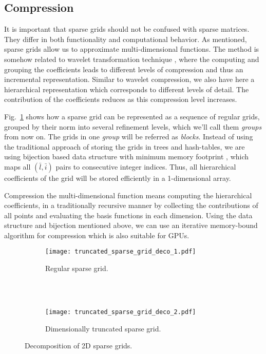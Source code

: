 \subsection{Compression}

It is important that sparse grids should not be confused with sparse matrices.
They differ in both functionality and computational behavior. As mentioned,
sparse grids allow us to approximate multi-dimensional functions. The method is
somehow related to wavelet transformation technique \cite{Mallat89atheory},
where the computing and grouping the coefficients leads to different levels of
compression and thus an incremental representation. Similar to wavelet
compression, we also have here a hierarchical representation which corresponds
to different levels of detail. The contribution of the coefficients reduces as
this compression level increases.

Fig.~\ref{fig:truncated_sparse_grid_deco_1} shows how a sparse grid can be
represented as a sequence of regular grids, grouped by their norm into several
refinement levels, which we'll call them \textit{groups} from now on. The grids
in one \textit{group} will be referred as \textit{blocks}. Instead of using the
traditional approach of storing the grids in trees and hash-tables, we are using
bijection based data structure with minimum memory footprint
\cite{Murarasu:2011:CDS:1941553.1941559}, which maps all $(\bar{l},\bar{i})$
pairs to consecutive integer indices. Thus, all hierarchical coefficients of the
grid will be stored efficiently in a 1-dimensional array.

Compression the multi-dimensional function means computing the hierarchical
coefficients, in a traditionally recursive manner by collecting the
contributions of all points and evaluating the basis functions in each
dimension. Using the data structure and bijection mentioned above, we can use an
iterative memory-bound algorithm for compression which is also suitable for
GPUs.

\begin{figure}[t]
  \begin{subfigure}[b]{1\linewidth}
    \centering
    \texttt{[image: truncated\_sparse\_grid\_deco\_1.pdf]}
    \caption{Regular sparse grid.}
    \label{fig:truncated_sparse_grid_deco_1}
  \end{subfigure}
  \\ \\
  \begin{subfigure}[b]{1\linewidth}
    \centering
    \texttt{[image: truncated\_sparse\_grid\_deco\_2.pdf]}
    \caption{Dimensionally truncated sparse grid.}
    \label{fig:truncated_sparse_grid_deco_2}
  \end{subfigure}
  \caption{Decomposition of 2D sparse grids.}
  \label{fig:truncated_sparse_grid_deco}
\end{figure}


